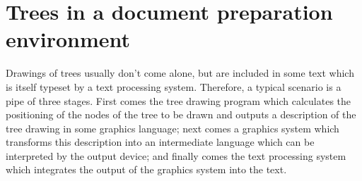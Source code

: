 

\section{Trees in a document preparation environment}                           
                                                                                
Drawings of trees usually don't come alone, but are included in some text       
which is itself typeset by a text processing system. Therefore, a typical      
scenario is a pipe of three stages. First comes the tree drawing             
program which calculates the positioning of the nodes of the tree to            
be drawn and outputs a description of the tree drawing in                       
some graphics language; next comes a graphics system which transforms this      
description into an intermediate language which can be interpreted by the output
device; and finally comes the                                                   
text processing system which integrates the output of the                       
graphics system into the text.                                 
                                                                                
